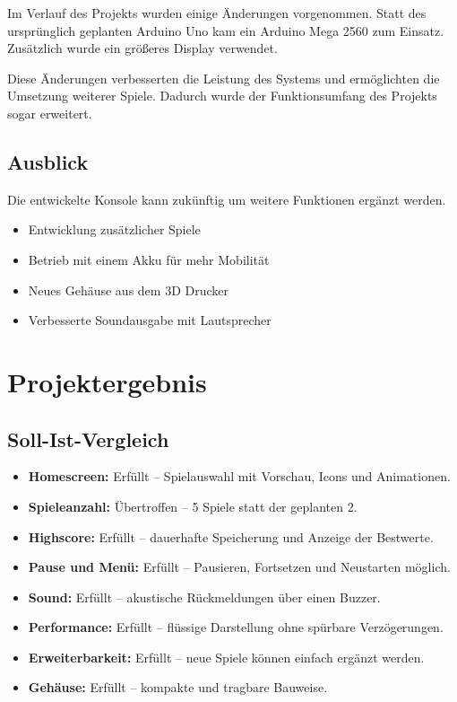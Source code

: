 \documentclass[12pt,a4paper]{article}
\begin{document}
Im Verlauf des Projekts wurden einige Änderungen vorgenommen. Statt des ursprünglich geplanten Arduino Uno kam ein Arduino Mega 2560 zum Einsatz. Zusätzlich wurde ein größeres Display verwendet.

Diese Änderungen verbesserten die Leistung des Systems und ermöglichten die Umsetzung weiterer Spiele. Dadurch wurde der Funktionsumfang des Projekts sogar erweitert.

\subsection{Ausblick}

Die entwickelte Konsole kann zukünftig um weitere Funktionen ergänzt werden.

\begin{itemize}[noitemsep]
\item Entwicklung zusätzlicher Spiele
\item Betrieb mit einem Akku für mehr Mobilität
\item Neues Gehäuse aus dem 3D Drucker
\item Verbesserte Soundausgabe mit Lautsprecher
\end{itemize}

\section{Projektergebnis}

\subsection{Soll-Ist-Vergleich}

\begin{itemize}[leftmargin=*,noitemsep]
\item \textbf{Homescreen:} Erfüllt – Spielauswahl mit Vorschau, Icons und Animationen.
\item \textbf{Spieleanzahl:} Übertroffen – 5 Spiele statt der geplanten 2.
\item \textbf{Highscore:} Erfüllt – dauerhafte Speicherung und Anzeige der Bestwerte.
\item \textbf{Pause und Menü:} Erfüllt – Pausieren, Fortsetzen und Neustarten möglich.
\item \textbf{Sound:} Erfüllt – akustische Rückmeldungen über einen Buzzer.
\item \textbf{Performance:} Erfüllt – flüssige Darstellung ohne spürbare Verzögerungen.
\item \textbf{Erweiterbarkeit:} Erfüllt – neue Spiele können einfach ergänzt werden.
\item \textbf{Gehäuse:} Erfüllt – kompakte und tragbare Bauweise.
\end{itemize}
\end{document}
